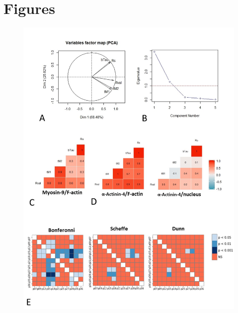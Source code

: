 \documentclass[alpha-refs]{wiley-article}
\begin{document}
\section*{Figures}

\begin{figure}[hbt!]
  \includegraphics[width=1\linewidth]{supp1.jpg}
  \caption{}
  \centering
\end{figure}
\end{document}
